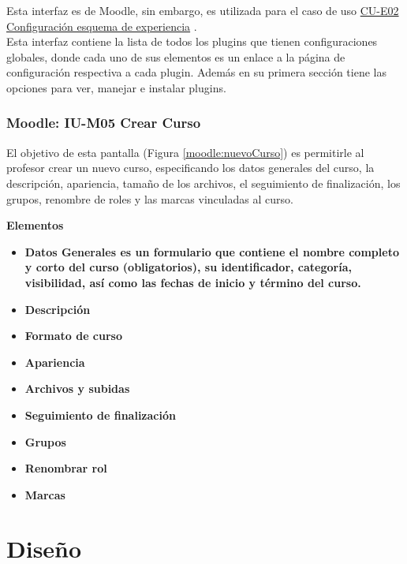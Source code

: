    Esta interfaz es de Moodle, sin embargo, es utilizada para el caso de uso \hyperref[CU-E02]{CU-E02 Configuración esquema de experiencia} .\\

    \noindent Esta interfaz contiene la lista de todos los plugins que tienen configuraciones globales, donde cada uno de sus elementos es un enlace a la página de configuración respectiva a cada plugin. Además en su primera sección tiene las opciones para ver, manejar e instalar plugins.\\

	\clearpage


\subsection*{Moodle: IU-M05 Crear Curso}

 El objetivo de esta pantalla (Figura \ref{moodle:nuevoCurso}) es permitirle al profesor crear un nuevo curso, especificando los datos generales del curso, la descripción, apariencia, tamaño de los archivos, el seguimiento de finalización, los grupos, renombre de roles y las marcas vinculadas al curso.


    {\bf Elementos}
    \begin{itemize}
        \item \bf{Datos Generales} es un formulario que contiene el nombre completo y corto del curso (obligatorios), su identificador, categoría, visibilidad, así como las fechas de inicio y término del curso.
        \item \bf{Descripción}
        \item \bf{Formato de curso}
        \item \bf{Apariencia}
        \item \bf{Archivos y subidas}
        \item \bf{Seguimiento de finalización}
        \item \bf{Grupos}
        \item \bf{Renombrar rol}
        \item \bf{Marcas}
    \end{itemize}


\chapter{Diseño}

